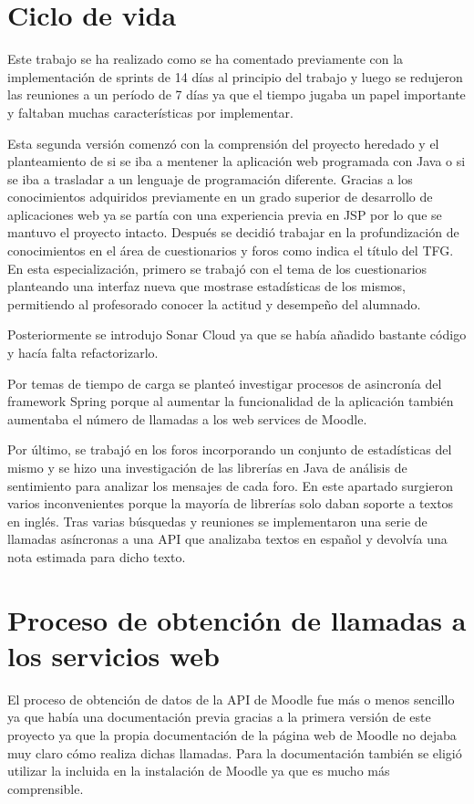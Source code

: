 \section{Ciclo de vida}
Este trabajo se ha realizado como se ha comentado previamente con la implementación de sprints de 14 días al principio del trabajo y luego se redujeron las reuniones a un período de 7 días ya que el tiempo jugaba un papel importante y faltaban muchas características por implementar.

Esta segunda versión comenzó con la comprensión del proyecto heredado y el planteamiento de si se iba a mentener la aplicación web programada con Java o si se iba a trasladar a un lenguaje de programación diferente. Gracias a los conocimientos adquiridos previamente en un grado superior de desarrollo de aplicaciones web ya se partía con una experiencia previa en JSP por lo que se mantuvo el proyecto intacto.
Después se decidió trabajar en la profundización de conocimientos en el área de cuestionarios y foros como indica el título del TFG. En esta especialización, primero se trabajó con el tema de los cuestionarios planteando una interfaz nueva que mostrase estadísticas de los mismos, permitiendo al profesorado conocer la actitud y desempeño del alumnado.

Posteriormente se introdujo Sonar Cloud ya que se había añadido bastante código y hacía falta refactorizarlo.

Por temas de tiempo de carga se planteó investigar procesos de asincronía del framework Spring porque al aumentar la funcionalidad de la aplicación también aumentaba el número de llamadas a los web services de Moodle.

Por último, se trabajó en los foros incorporando un conjunto de estadísticas del mismo y se hizo una investigación de las librerías en Java de análisis de sentimiento para analizar los mensajes de cada foro. En este apartado surgieron varios inconvenientes porque la mayoría de librerías solo daban soporte a textos en inglés. Tras varias búsquedas y reuniones se implementaron una serie de llamadas asíncronas a una API que analizaba textos en español y devolvía una nota estimada para dicho texto.

\section{Proceso de obtención de llamadas a los servicios web}
El proceso de obtención de datos de la API de Moodle fue más o menos sencillo ya que había una documentación previa gracias a la primera versión de este proyecto ya que la propia documentación de la página web de Moodle no dejaba muy claro cómo realiza dichas llamadas.
Para la documentación también se eligió utilizar la incluida en la instalación de Moodle ya que es mucho más comprensible.

